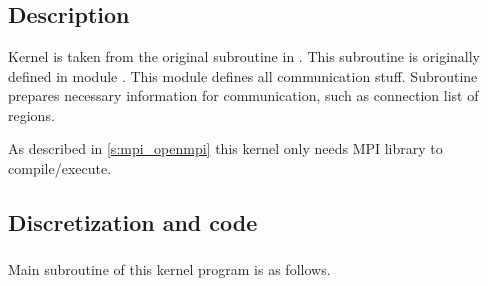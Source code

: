 \section{}

\subsection{Description}

Kernel  is taken from the original subroutine
 in \NICAM.
%
This subroutine is originally defined in module .
%
This module defines all communication stuff.
%
Subroutine  prepares necessary information for
communication, such as connection list of regions.

As described in \autoref{s:mpi_openmpi} this kernel only needs MPI
library to compile/execute.

\subsection{Discretization and code}



\subsubsection{}

Main subroutine of this kernel program  is as follows.

